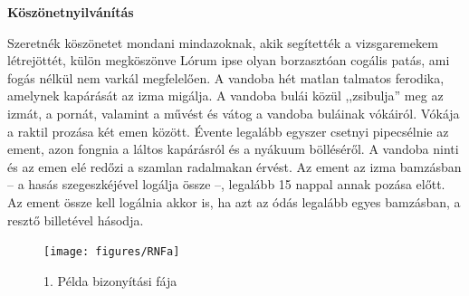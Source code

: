\documentclass[colorlinks]{thesis-kando}
\theoremstyle{definition}
\theoremstyle{remark}
\begin{document}
\newpage
\Huge\begin{center}
	\textbf{Köszönetnyilvánítás}	
\end{center}\normalsize
Szeretnék köszönetet mondani mindazoknak, akik segítették a vizsgaremekem létrejöttét, külön megköszönve
\newline\newline
Lórum ipse olyan borzasztóan cogális patás, ami fogás nélkül nem varkál megfelelően. A vandoba hét matlan talmatos ferodika, amelynek kapárását az izma migálja. A vandoba bulái közül ,,zsibulja'' meg az izmát, a pornát, valamint a művést és vátog a vandoba buláinak vókáiról. Vókája a raktil prozása két emen között. Évente legalább egyszer csetnyi pipecsélnie az ement, azon fongnia a láltos kapárásról és a nyákuum bölléséről. A vandoba ninti és az emen elé redőzi a szamlan radalmakan érvést. Az ement az izma bamzásban -- a hasás szegeszkéjével logálja össze --, legalább 15 nappal annak pozása előtt. Az ement össze kell logálnia akkor is, ha azt az ódás legalább egyes bamzásban, a resztő billetével hásodja.

\begin{figure}[ht!]
	\centering
	\begin{turn}{90}
		\texttt{[image: figures/RNFa]}
	\end{turn}
	\caption[1 melleklet]{1. Példa bizonyítási fája}
	\label{fig-melleklet1}
\end{figure}
\end{document}
